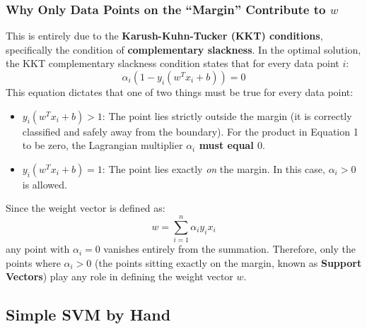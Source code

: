\documentclass[twoside, 10pt]{article}
\begin{document}
\subsubsection{Why Only Data Points on the ``Margin'' Contribute to \texorpdfstring{$w$}{w}}
This is entirely due to the \textbf{Karush-Kuhn-Tucker (KKT) conditions}, specifically the condition of \textbf{complementary slackness}. 
In the optimal solution, the KKT complementary slackness condition states that for every data point $i$:
\begin{equation}
    \alpha_i \left( 1 - y_i(w^T x_i + b) \right) = 0
\end{equation}
This equation dictates that one of two things must be true for every data point:
\begin{itemize}
    \item \textbf{$y_i(w^T x_i + b) > 1$}: The point lies strictly outside the margin (it is correctly classified and safely away from the boundary). For the product in Equation 1 to be zero, the Lagrangian multiplier \textbf{$\alpha_i$ must equal $0$}.
    \item \textbf{$y_i(w^T x_i + b) = 1$}: The point lies exactly \textit{on} the margin. In this case, \textbf{$\alpha_i > 0$} is allowed.
\end{itemize}
Since the weight vector is defined as:
\begin{equation}
    w = \sum_{i=1}^n \alpha_i y_i x_i
\end{equation}
any point with $\alpha_i = 0$ vanishes entirely from the summation. Therefore, only the points where $\alpha_i > 0$ (the points sitting exactly on the margin, known as \textbf{Support Vectors}) play any role in defining the weight vector $w$.

\subsection{Simple SVM by Hand}
\end{document}
